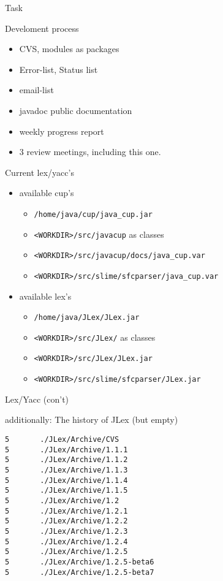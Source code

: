 

\begin{myslide}{Task}
  
\end{myslide}


\begin{myslide}{Develoment process}
  \begin{itemize}
  \item CVS, modules as packages
  \item Error-list, Status list
  \item email-list
  \item javadoc public documentation
  \item weekly progress report
  \item 3 review meetings, including this one. 
  \end{itemize}
\end{myslide}


\begin{myslide}{Current lex/yacc's}
  \begin{itemize}
  \item available cup's
    \begin{itemize}
    \item \verb+/home/java/cup/java_cup.jar+
    \item \verb+<WORKDIR>/src/javacup+ as classes
    \item \verb+<WORKDIR>/src/javacup/docs/java_cup.var+ 
    \item \verb+<WORKDIR>/src/slime/sfcparser/java_cup.var+ 
    \end{itemize}
  \item available lex's
    \begin{itemize}
    \item \verb+/home/java/JLex/JLex.jar+
    \item \verb+<WORKDIR>/src/JLex/+ as classes
    \item \verb+<WORKDIR>/src/JLex/JLex.jar+
    \item \verb+<WORKDIR>/src/slime/sfcparser/JLex.jar+ 
    \end{itemize}
  \end{itemize}
\end{myslide}

\begin{myslide}{Lex/Yacc (con't)}
    
additionally: The history of JLex (but empty)

\begin{verbatim}
5       ./JLex/Archive/CVS
5       ./JLex/Archive/1.1.1
5       ./JLex/Archive/1.1.2
5       ./JLex/Archive/1.1.3
5       ./JLex/Archive/1.1.4
5       ./JLex/Archive/1.1.5
5       ./JLex/Archive/1.2
5       ./JLex/Archive/1.2.1
5       ./JLex/Archive/1.2.2
5       ./JLex/Archive/1.2.3
5       ./JLex/Archive/1.2.4
5       ./JLex/Archive/1.2.5
5       ./JLex/Archive/1.2.5-beta6
5       ./JLex/Archive/1.2.5-beta7
\end{verbatim}
    
\end{myslide}  

